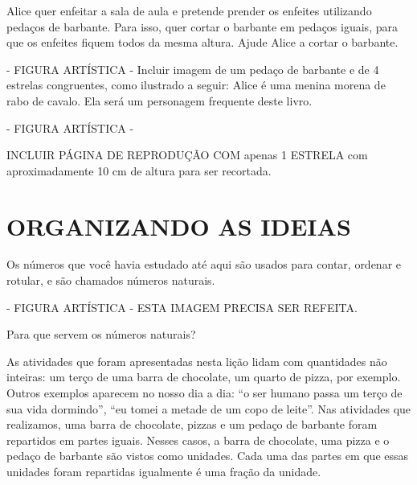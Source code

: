 \documentclass[a4,12pt]{book}
\begin{document}
Alice quer enfeitar a sala de aula e pretende prender os enfeites utilizando pedaços de barbante. Para isso, quer cortar o barbante em pedaços iguais, para que os enfeites fiquem todos da mesma altura. Ajude Alice a cortar o barbante.

\begin{imagem*}[breakable]{}{}    - FIGURA ARTÍSTICA - Incluir imagem de um pedaço de barbante e de 4 estrelas congruentes, como ilustrado a seguir:
  Alice é uma menina morena de rabo de cavalo. Ela será um personagem frequente deste livro.

\end{imagem*}

\begin{imagem*}[breakable]{}{}   - FIGURA ARTÍSTICA -
  \begin{nota*}[breakable]{}{}
    INCLUIR PÁGINA DE REPRODUÇÃO COM apenas 1 ESTRELA com aproximadamente 10 cm de altura para ser recortada.
  \end{nota*}
\end{imagem*}







\section{ ORGANIZANDO AS IDEIAS }





Os números que você havia estudado até aqui são usados para contar, ordenar e rotular, e são chamados números naturais.
\begin{imagem*}[breakable]{}{}   - FIGURA ARTÍSTICA - ESTA IMAGEM PRECISA SER REFEITA.
\end{imagem*}

Para que servem os números naturais?

As atividades que foram apresentadas nesta lição lidam com quantidades não inteiras: um terço de uma barra de chocolate, um quarto de pizza, por exemplo.
Outros exemplos aparecem no nosso dia a dia: ``o ser humano passa um terço de sua vida dormindo'', ``eu tomei a metade de um copo de leite''.
Nas atividades que realizamos, uma barra de chocolate, pizzas e um pedaço de barbante foram repartidos em partes iguais.
Nesses casos, a barra de chocolate, uma pizza e o pedaço de barbante são vistos como unidades.
Cada uma das partes em que essas unidades foram repartidas igualmente é uma fração da unidade.
\end{document}
